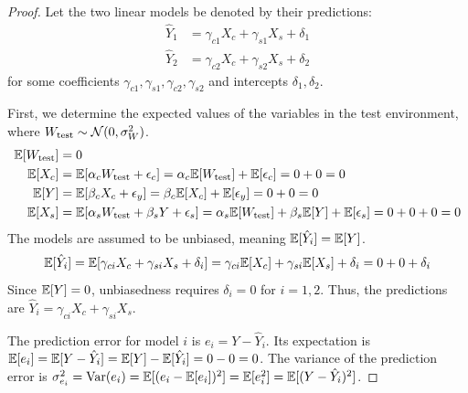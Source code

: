 \documentclass[../thesis.tex]{subfiles}
\begin{document}
\begin{proof}
Let the two linear models be denoted by their predictions:
\begin{align*}
    \hat{Y}_1 &= \gamma_{c1} X_c + \gamma_{s1} X_s + \delta_1 \\
    \hat{Y}_2 &= \gamma_{c2} X_c + \gamma_{s2} X_s + \delta_2
\end{align*}
for some coefficients $\gamma_{c1}, \gamma_{s1}, \gamma_{c2}, \gamma_{s2}$ and intercepts $\delta_1, \delta_2$.

First, we determine the expected values of the variables in the test environment, where $W_{\text{test}} \sim \mathcal{N}(0, \sigma_W^2)$.
\begin{align*}
    \mathbb{E}[W_{\text{test}}] &= 0 \\
    \mathbb{E}[X_c] &= \mathbb{E}[\alpha_c W_{\text{test}} + \epsilon_c] = \alpha_c \mathbb{E}[W_{\text{test}}] + \mathbb{E}[\epsilon_c] = 0 + 0 = 0 \\
    \mathbb{E}[Y] &= \mathbb{E}[\beta_c X_c + \epsilon_y] = \beta_c \mathbb{E}[X_c] + \mathbb{E}[\epsilon_y] = 0 + 0 = 0 \\
    \mathbb{E}[X_s] &= \mathbb{E}[\alpha_s W_{\text{test}} + \beta_s Y + \epsilon_s] = \alpha_s \mathbb{E}[W_{\text{test}}] + \beta_s \mathbb{E}[Y] + \mathbb{E}[\epsilon_s] = 0 + 0 + 0 = 0
\end{align*}
The models are assumed to be unbiased, meaning $\mathbb{E}[\hat{Y}_i] = \mathbb{E}[Y]$.
$$ \mathbb{E}[\hat{Y}_i] = \mathbb{E}[\gamma_{ci} X_c + \gamma_{si} X_s + \delta_i] = \gamma_{ci} \mathbb{E}[X_c] + \gamma_{si} \mathbb{E}[X_s] + \delta_i = 0 + 0 + \delta_i $$
Since $\mathbb{E}[Y] = 0$, unbiasedness requires $\delta_i = 0$ for $i=1, 2$. Thus, the predictions are $\hat{Y}_i = \gamma_{ci} X_c + \gamma_{si} X_s$.

The prediction error for model $i$ is $e_i = Y - \hat{Y}_i$. Its expectation is $\mathbb{E}[e_i] = \mathbb{E}[Y - \hat{Y}_i] = \mathbb{E}[Y] - \mathbb{E}[\hat{Y}_i] = 0 - 0 = 0$.
The variance of the prediction error is $\sigma^2_{e_i} = \mathrm{Var}(e_i) = \mathbb{E}[(e_i - \mathbb{E}[e_i])^2] = \mathbb{E}[e_i^2] = \mathbb{E}[(Y - \hat{Y}_i)^2]$.


\end{proof}
\end{document}
